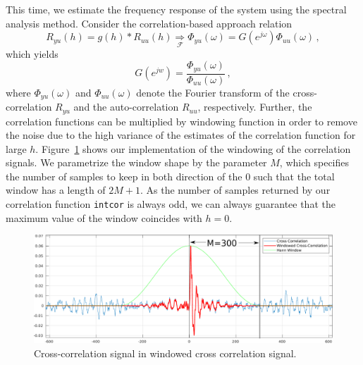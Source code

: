 \documentclass{scrartcl}
\begin{document}
This time, we estimate the frequency response of the system using the spectral analysis method.
Consider the correlation-based approach relation
\begin{equation}
	R_{yu}(h) = g(h) * R_{uu}(h) \underset{\mathcal{F}}{\Rightarrow} \Phi_{yu}(\omega) = G(e^{j \omega}) \Phi_{uu}(\omega)\, ,
\end{equation}
which yields
\begin{equation}
	G(e^{jw}) = \frac{\Phi_{yu}(\omega)}{\Phi_{uu}(\omega)}\, ,
\end{equation}
where $\Phi_{yu}(\omega)$ and $\Phi_{uu}(\omega)$ denote the Fourier transform of the cross-correlation $R_{yu}$ and the auto-correlation $R_{uu}$, respectively.
Further, the correlation functions can be multiplied by windowing function in order to remove the noise due to the high variance of the estimates of the correlation function for large $h$.
Figure~\ref{fig:cross_corr_windowed} shows our implementation of the windowing of the correlation signals.
We parametrize the window shape by the parameter $M$, which specifies the number of samples to keep in both direction of the $0$ such that the total window has a length of $2M+1$. As the number of samples returned by our correlation function \texttt{intcor} is always odd, we can always guarantee that the maximum value of the window coincides with $h=0$.
\begin{figure}[h]
	\centering
	\includegraphics[width=\textwidth]{figures/windowed_cross_cor.pdf}
	\caption{Cross-correlation signal in windowed cross correlation signal.}
	\label{fig:cross_corr_windowed}
\end{figure}
\end{document}
